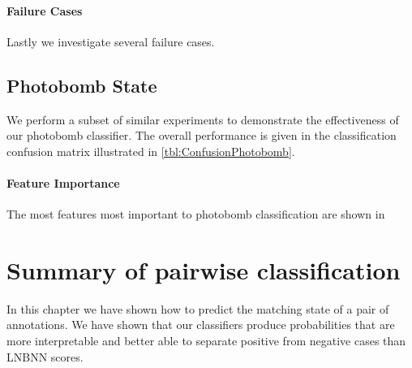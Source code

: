         \MatchWordCloud{}
        \ImportantMatchFeat{}

        \paragraph{Failure Cases}
        Lastly we investigate several failure cases.

        \PairFailIN{} 

        \PairFailNP{}

        \PairFailPN{}


    \subsection{Photobomb State}
        We perform a subset of similar experiments to demonstrate the effectiveness of
        our photobomb classifier.
        The overall performance is given in the classification confusion matrix
        illustrated in \cref{tbl:ConfusionPhotobomb}.

        \ConfusionPhotobomb{}

        \EvalMetricsPhotobomb{}

        \paragraph{Feature Importance}
        The most features most important to photobomb classification are shown in

        \ImportantPBFeat{}


\section{Summary of pairwise classification}

    In this chapter we have shown how to predict the matching state of a pair of annotations. 
    We have shown that our classifiers produce probabilities that are more
    interpretable and better able to separate positive from negative cases than
    LNBNN scores. 
